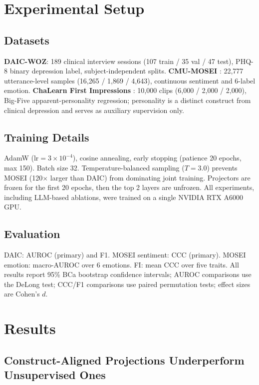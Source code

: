 \documentclass[letterpaper]{article}
\begin{document}
\section{Experimental Setup}

\subsection{Datasets}

\textbf{DAIC-WOZ}: 189 clinical interview sessions (107 train / 35 val / 47 test), PHQ-8 binary depression label, subject-independent splits. \textbf{CMU-MOSEI} \citep{zadeh2018multimodal}: 22{,}777 utterance-level samples (16{,}265 / 1{,}869 / 4{,}643), continuous sentiment and 6-label emotion. \textbf{ChaLearn First Impressions} \citep{escalante2020chalearn}: 10{,}000 clips (6{,}000 / 2{,}000 / 2{,}000), Big-Five apparent-personality regression; personality is a distinct construct from clinical depression and serves as auxiliary supervision only.

\subsection{Training Details}

AdamW ($\text{lr}{=}3\times10^{-4}$), cosine annealing, early stopping (patience 20 epochs, max 150). Batch size 32. Temperature-balanced sampling ($T{=}3.0$) prevents MOSEI (120$\times$ larger than DAIC) from dominating joint training. Projectors are frozen for the first 20 epochs, then the top 2 layers are unfrozen. All experiments, including LLM-based ablations, were trained on a single NVIDIA RTX A6000 GPU.

\subsection{Evaluation}

DAIC: AUROC (primary) and F1. MOSEI sentiment: CCC (primary). MOSEI emotion: macro-AUROC over 6 emotions. FI: mean CCC over five traits. All results report 95\% BCa bootstrap confidence intervals; AUROC comparisons use the DeLong test; CCC/F1 comparisons use paired permutation tests; effect sizes are Cohen's $d$.

\section{Results}
\label{sec:results}

\subsection{Construct-Aligned Projections Underperform Unsupervised Ones}
\label{sec:construct-bottleneck}
\end{document}
